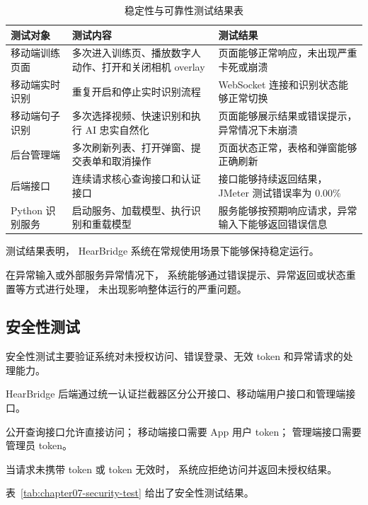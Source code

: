 \begin{longtable}{L{0.22\textwidth} L{0.34\textwidth} L{0.34\textwidth}}
  \caption{稳定性与可靠性测试结果表}
  \label{tab:chapter07-stability-test}\\
  \toprule
  测试对象 & 测试内容 & 测试结果 \\
  \midrule
  移动端训练页面 & 多次进入训练页、播放数字人动作、打开和关闭相机 overlay & 页面能够正常响应，未出现严重卡死或崩溃 \\
  移动端实时识别 & 重复开启和停止实时识别流程 & WebSocket 连接和识别状态能够正常切换 \\
  移动端句子识别 & 多次选择视频、快速识别和执行 AI 忠实自然化 & 页面能够展示结果或错误提示，异常情况下未崩溃 \\
  后台管理端 & 多次刷新列表、打开弹窗、提交表单和取消操作 & 页面状态正常，表格和弹窗能够正确刷新 \\
  后端接口 & 连续请求核心查询接口和认证接口 & 接口能够持续返回结果，JMeter 测试错误率为 0.00\% \\
  Python 识别服务 & 启动服务、加载模型、执行识别和重载模型 & 服务能够按预期响应请求，异常输入下能够返回错误信息 \\
  \bottomrule
\end{longtable}

测试结果表明，
HearBridge 系统在常规使用场景下能够保持稳定运行。

在异常输入或外部服务异常情况下，
系统能够通过错误提示、异常返回或状态重置等方式进行处理，
未出现影响整体运行的严重问题。

\subsection{安全性测试}

安全性测试主要验证系统对未授权访问、错误登录、无效 token 和异常请求的处理能力。

HearBridge 后端通过统一认证拦截器区分公开接口、移动端用户接口和管理端接口。

公开查询接口允许直接访问；
移动端接口需要 App 用户 token；
管理端接口需要管理员 token。

当请求未携带 token 或 token 无效时，
系统应拒绝访问并返回未授权结果。

表~\ref{tab:chapter07-security-test} 给出了安全性测试结果。

